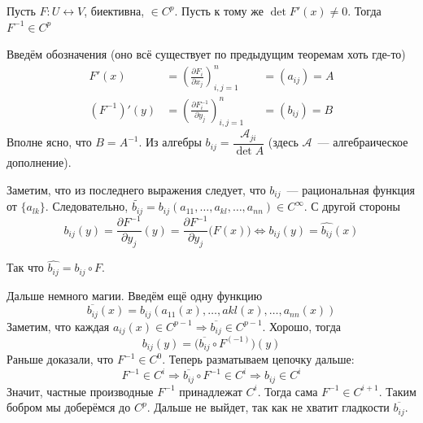 \documentclass[12pt,trimbord]{../../../notes}
\begin{document}
\begin{thrm}\label{thrm:diffspace::invsmooth}
  Пусть $F\colon U \leftrightarrow V$, биективна, $\in C^p$. Пусть к тому же $\det F'(x) \neq 0$.
  Тогда $F^{-1} \in C^p$
\end{thrm}
\begin{ittproof}
  Введём обозначения (оно всё существует по предыдущим теоремам хоть где-то)
  \[
    \begin{aligned}
      F'(x) &= \left(\frac{\partial F_i}{\partial x_j}\right)_{i,j=1}^n & &= (a_{ij}) = A \\
      (F^{-1})'(y) &= \left(\frac{\partial F^{-1}_i}{\partial y_j}\right)_{i,j=1}^n & &= (b_{ij}) = B 
    \end{aligned}
  \]
  Вполне ясно, что $B = A^{-1}$. Из алгебры $b_{ij} = \dfrac{\mathcal A_{ji}}{\det A}$ 
  (здесь $\mathcal A$~--- алгебраическое дополнение).
  
  Заметим, что из последнего выражения следует, что $b_{ij}$~--- рациональная функция от $\{a_{lk}\}$.
  Следовательно, $\widetilde{b_{ij}} = b_{ij}(a_{11}, \dotsc, a_{kl}, \dotsc, a_{nn}) \in C^\infty$.
  С другой стороны
  \[
    b_{ij}(y) = \frac{\partial F^{-1}}{\partial y_j}(y) = \frac{\partial F^{-1}}{\partial y_j}\bigl(F(x)\bigr)
    \Leftrightarrow b_{ij}(y) = \widehat{b_{ij}}(x)
  \]

  Так что $\widehat{b_{ij}} = b_{ij} \circ F$. 

  Дальше немного магии. Введём ещё одну функцию
  \[
    \overline{b_{ij}}(x) = b_{ij}(a_{11}(x), \dotsc, a{kl}(x), \dotsc, a_{nn}(x))   
  \]
  Заметим, что каждая $a_{ij}(x) \in C^{p-1} \Rightarrow \overline{b_{ij}} \in C^{p-1}$.
  Хорошо, тогда 
  \[
    b_{ij}(y) = \bigl(\overline{b_{ij}} \circ F^{(-1)}\bigr)(y) 
  \]
  Раньше доказали, что $F^{-1} \in C^0$. Теперь разматываем цепочку дальше:
  \[
    F^{-1} \in C^i \Rightarrow \overline{b_{ij}} \circ F^{-1} \in C^i \Rightarrow b_{ij} \in C^i 
  \]
  Значит, частные производные $F^{-1}$ принадлежат $C^i$. Тогда сама $F^{-1} \in C^{i+1}$.
  Таким бобром мы доберёмся до $C^p$. 
  Дальше не выйдет, так как не хватит гладкости $\overline{b_{ij}}$.
\end{ittproof}
\end{document}
